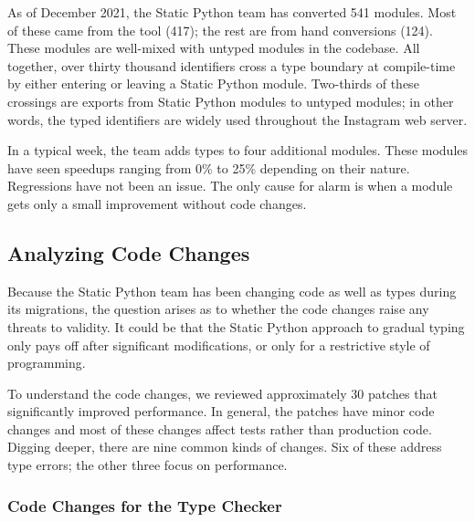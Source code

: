\documentclass[english,cleveref,submission]{programming}
\newcommand{\SP}{Static Python}
\begin{document}
As of December 2021, the \SP{} team has converted 541 modules.
Most of these came from the tool (417); the rest
are from hand conversions (124).
These modules are well-mixed with untyped modules in the codebase.
All together, over thirty thousand identifiers cross a type boundary
at compile-time by either entering or leaving a \SP{} module.
Two-thirds of these crossings are exports from \SP{} modules
to untyped modules;
in other words, the typed identifiers are widely used throughout the Instagram web server.

In a typical week, the team adds types to four additional modules.
These modules have seen speedups ranging from 0\% to 25\% depending
on their nature.
Regressions have not been an issue.
The only cause for alarm is when a module gets only a small improvement
without code changes.


\subsection{Analyzing Code Changes}

Because the \SP{} team has been changing code as well as types
during its migrations, the question arises as to whether the code changes
raise any threats to validity.
It could be that the \SP{} approach to gradual typing only pays off
after significant modifications, or only for a restrictive style of programming.

To understand the code changes, we reviewed approximately 30 patches that
significantly improved performance.
In general, the patches have minor code changes and most of these changes
affect tests rather than production code.
Digging deeper, there are nine common kinds of changes.
Six of these address type errors; the other three focus on performance.


\subsubsection{Code Changes for the Type Checker}
\end{document}
